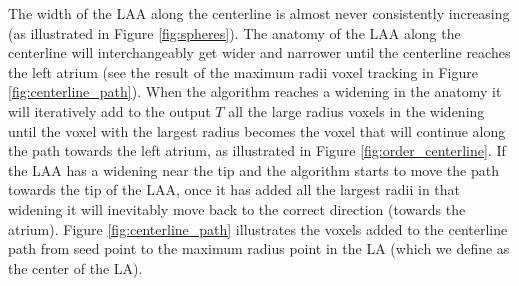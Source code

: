 \documentclass[review]{elsarticle}
\begin{document}
The width of the LAA along the centerline is almost never consistently
increasing (as illustrated in Figure \ref{fig:spheres}).  The anatomy of the
LAA along the centerline will interchangeably get wider and narrower until the
centerline reaches the left atrium (see the result of the maximum radii voxel
tracking in Figure \ref{fig:centerline_path}).  When the algorithm reaches a
widening in the anatomy it will iteratively add to the output $T$ all the large
radius voxels in the widening until the voxel with the largest radius becomes
the voxel that will continue along the path towards the left atrium, as
illustrated in Figure \ref{fig:order_centerline}.  If the LAA has a widening
near the tip and the algorithm starts to move the path towards the tip of the
LAA, once it has added all the largest radii in that widening it will
inevitably move back to the correct direction (towards the atrium).  Figure
\ref{fig:centerline_path} illustrates the voxels added to the centerline path
from seed point to the maximum radius point in the LA (which we define as the
center of the LA). 
\end{document}
